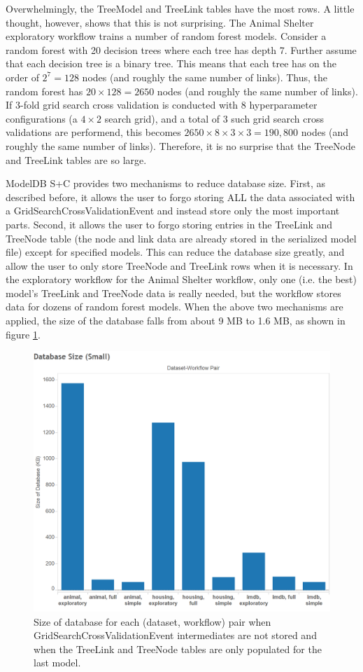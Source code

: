Overwhelmingly, the TreeModel and TreeLink tables have the most rows. A little
thought, however, shows that this is not surprising. The Animal Shelter exploratory workflow
trains a number of random forest models. Consider
a random forest with 20 decision trees where each tree has depth 7. Further assume
that each decision tree is a binary tree. This means that each tree has on the
order of $2^{7} = 128$ nodes (and roughly the same number of links). Thus, the
random forest has $20 \times 128 = 2650$ nodes (and roughly the same number of links).
If 3-fold grid search cross validation is conducted with 8 hyperparameter configurations (a $4 \times 2$ 
search grid), and a total of 3 such grid search cross validations are performend, 
this becomes $2650 \times 8 \times 3 \times 3 = 190,800$ nodes (and roughly the same number of links).
Therefore, it is no surprise that the TreeNode and TreeLink tables are so large.

ModelDB S+C provides two mechanisms to reduce database size. First, as described before, it
allows the user to forgo storing ALL the data associated with a GridSearchCrossValidationEvent and instead
store only the most important parts.
Second, it allows the user to forgo storing entries in the TreeLink and TreeNode table (the
node and link data are already stored in the serialized model file) except for specified models. This can reduce the database size
greatly, and allow the user to only store TreeNode and TreeLink rows when it is necessary. In the 
exploratory workflow for the Animal Shelter workflow, only one (i.e. the best)  model's TreeLink and TreeNode data is really needed,
but the workflow stores data for dozens of random forest models. When the above two mechanisms are applied,
the size of the database falls from about 9 MB to 1.6 MB, as shown in figure \ref{fig:dbsize_small}.

\begin{figure}
  \centering
  \includegraphics[width=5.0in]{dbsize_small}
  \caption{
    Size of database for each (dataset, workflow) pair when GridSearchCrossValidationEvent intermediates
    are not stored and when the TreeLink and TreeNode tables are only populated for the last model.
  }
  \label{fig:dbsize_small}
\end{figure}


